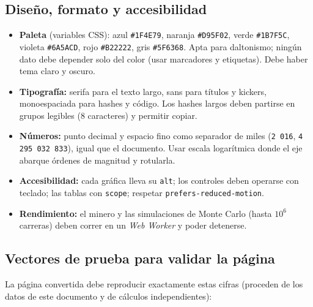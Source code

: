 \documentclass[11pt,a4paper]{article}
\begin{document}
\subsection{Diseño, formato y accesibilidad}

\begin{itemize}[leftmargin=1.4em,itemsep=2pt]
  \item \textbf{Paleta} (variables CSS): azul \texttt{\#1F4E79}, naranja \texttt{\#D95F02}, verde \texttt{\#1B7F5C}, violeta \texttt{\#6A5ACD}, rojo \texttt{\#B22222}, gris \texttt{\#5F6368}. Apta para daltonismo; ningún dato debe depender solo del color (usar marcadores y etiquetas). Debe haber tema claro y oscuro.
  \item \textbf{Tipografía:} serifa para el texto largo, sans para títulos y kickers, monoespaciada para hashes y código. Los hashes largos deben partirse en grupos legibles (8 caracteres) y permitir copiar.
  \item \textbf{Números:} punto decimal y espacio fino como separador de miles (\texttt{2\,016}, \texttt{4\,295\,032\,833}), igual que el documento. Usar escala logarítmica donde el eje abarque órdenes de magnitud y rotularla.
  \item \textbf{Accesibilidad:} cada gráfica lleva su \texttt{alt}; los controles deben operarse con teclado; las tablas con \texttt{scope}; respetar \texttt{prefers-reduced-motion}.
  \item \textbf{Rendimiento:} el minero y las simulaciones de Monte Carlo (hasta $10^{6}$ carreras) deben correr en un \emph{Web Worker} y poder detenerse.
\end{itemize}

\subsection{Vectores de prueba para validar la página}

La página convertida debe reproducir exactamente estas cifras (proceden de los datos de este documento y de cálculos independientes):
\end{document}
